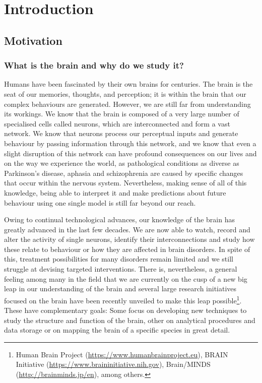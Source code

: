 \chapter{Introduction}

\label{Chapter01} %

\section{Motivation}

\subsection{What is the brain and why do we study it?}
Humans have been fascinated by their own brains for centuries. The brain is the
seat of our memories, thoughts, and perception; it is within the brain that our
complex behaviours are generated. However, we are still far from understanding
its workings. We know that the brain is composed of a very large number of
specialised cells called neurons, which are interconnected and form a vast
network. We know that neurons process our perceptual inputs and generate
behaviour by passing information through this network, and we know that even a
slight disruption of this network can have profound consequences on our lives
and on the way we experience the world, as pathological conditions as diverse as
Parkinson's disease, aphasia and schizophrenia are caused by specific changes
that occur within the nervous system. Nevertheless, making sense of all of this
knowledge, being able to interpret it and make predictions about future
behaviour using one single model is still far beyond our reach.

Owing to continual technological advances, our knowledge of the brain has
greatly advanced in the last few decades. We are now able to watch, record and
alter the activity of single neurons, identify their interconnections and study
how these relate to behaviour or how they are affected in brain disorders. In
spite of this, treatment possibilities for many disorders remain limited and we
still struggle at devising targeted interventions. There is, nevertheless, a
general feeling among many in the field that we are currently on the cusp of a
new big leap in our understanding of the brain and several large research
initiatives focused on the brain have been recently unveiled to make this leap
possible\footnote{Human Brain Project (\url{https://www.humanbrainproject.eu}),
BRAIN Initiative (\url{https://www.braininitiative.nih.gov}), Brain/MINDS
(\url{http://brainminds.jp/en}), among others.}. These have complementary goals:
Some focus on developing new techniques to study the structure and function of
the brain, other on analytical procedures and data storage or on mapping the
brain of a specific species in great detail.

